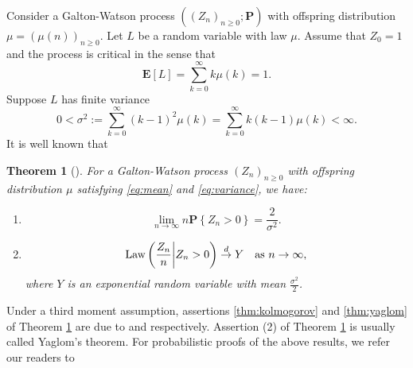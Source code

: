 \documentclass[12pt]{amsart}
\newtheorem{thm}{Theorem}[section]
\theoremstyle{remark}
\numberwithin{equation}{section}
\newcommand{\expr}[1]{\left( #1 \right)}
\newcommand{\set}[1]{\left\{ #1 \right\}}
\newcommand{\law}{\text{\rm Law}}
\newcommand{\tolaw}{\stackrel{d}{\to}}
\newcommand{\expct}{\mathbf E}
\newcommand{\bP}{\mathbf P}\newcommand{\bbP}{\mathbb P}\newcommand{\cP}{\mathcal P}
\begin{document}
Consider a Galton-Watson process $((Z_n)_{n\ge0}; \bP )$
with offspring distribution $\mu=(\mu(n))_{n\ge 0}$.
Let $L$ be a random variable with law $\mu$. Assume that $Z_0=1$ and the process is critical in the sense that
\begin{equation}
\label{eq:mean}
		\expct [L]
	=
	\sum_{k=0}^\infty k \mu(k)
	= 1.
\end{equation}
	Suppose $L$ has %
	finite variance
\begin{equation}
\label{eq:variance}
		0	
	<	
		\sigma^2
	:=
		\sum_{k=0}^\infty  (k-1)^2 \mu(k)
	=
		\sum_{k=0}^\infty k(k-1) \mu(k)
	<
		\infty.
\end{equation}
	It is well known that
\begin{thm}[\cite{kesten1966galton}]
\label{thm:kesten}
For a Galton-Watson process
$(Z_n)_{n\ge 0}$
with offspring distribution $\mu$ satisfying \eqref{eq:mean} and \eqref{eq:variance}, we have:
\begin{enumerate}
\item
\label{thm:kolmogorov}
\begin{equation*}
		\lim_{n \to \infty} n \bP \set{Z_n>0}
	=
		\frac{2}{\sigma^2}.
\end{equation*}
\item
\label{thm:yaglom}
\begin{equation*}
		\law\expr{\frac{Z_n}{n}\bigg| Z_n>0}
	\tolaw
		Y
\quad\mbox{as }n\to\infty,
\end{equation*}
where $Y$ is an exponential random variable with mean $\frac{\sigma^2}{2}$.
\end{enumerate}
\end{thm}
\par
	Under a third moment assumption, 
assertions \eqref{thm:kolmogorov} and \eqref{thm:yaglom} of Theorem \ref{thm:kesten}
are due to \cite{kolmogorov1938losung} and \cite{yaglom1947certain} respectively. 
Assertion (2) of Theorem \ref{thm:kesten} is usually called Yaglom's theorem.
For probabilistic proofs of the above results, we refer our readers to 
\end{document}
